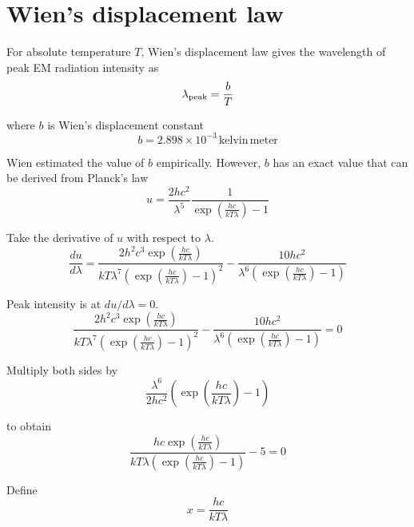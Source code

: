 

\section*{Wien's displacement law}

For absolute temperature $T$,
Wien's displacement law gives the wavelength
of peak EM radiation intensity as
\begin{equation*}
\lambda_{\rm peak}=\frac{b}{T}
\end{equation*}

where $b$ is Wien's displacement constant
\begin{equation*}
b=2.898\times10^{-3}\,\text{kelvin}\,\text{meter}
\end{equation*}

Wien estimated the value of $b$ empirically.
However, $b$ has an exact value that can be derived from Planck's law
\begin{equation*}
u=\frac{2hc^2}{\lambda^5}\frac{1}{\exp\left(\frac{hc}{kT\lambda}\right)-1}
\end{equation*}

Take the derivative of $u$ with respect to $\lambda$.
\begin{equation*}
\frac{du}{d\lambda}
=\frac{2h^2c^3\exp\left(\frac{hc}{kT\lambda}\right)}
{kT\lambda^7\left(\exp\left(\frac{hc}{kT\lambda}\right)-1\right)^2}
-\frac{10hc^2}{\lambda^6\left(\exp\left(\frac{hc}{kT\lambda}\right)-1\right)}
\end{equation*}

Peak intensity is at $du/d\lambda=0$.
\begin{equation*}
\frac{2h^2c^3\exp\left(\frac{hc}{kT\lambda}\right)}
{kT\lambda^7\left(\exp\left(\frac{hc}{kT\lambda}\right)-1\right)^2}
-\frac{10hc^2}{\lambda^6\left(\exp\left(\frac{hc}{kT\lambda}\right)-1\right)}=0
\end{equation*}

Multiply both sides by
\begin{equation*}
\frac{\lambda^6}{2hc^2}\left(\exp\left(\frac{hc}{kT\lambda}\right)-1\right)
\end{equation*}

to obtain
\begin{equation*}
\frac{hc\exp\left(\frac{hc}{kT\lambda}\right)}
{kT\lambda\left(\exp\left(\frac{hc}{kT\lambda}\right)-1\right)}-5=0
\end{equation*}

Define
\begin{equation*}
x=\frac{hc}{kT\lambda}
\end{equation*}

